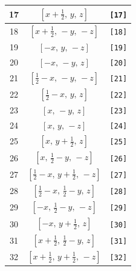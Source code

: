 \documentclass[fleqn,8pt]{jsarticle}
\begin{document}
\begin{longtable}{ccc}
17 & $\left[ x + \frac{1}{2},\, y,\, z \right]$ & {\tt [17]} \\ \hline
18 & $\left[ x + \frac{1}{2},\, - y,\, - z \right]$ & {\tt [18]} \\ \hline
19 & $\left[ - x,\, y,\, - z \right]$ & {\tt [19]} \\ \hline
20 & $\left[ - x,\, - y,\, z \right]$ & {\tt [20]} \\ \hline
21 & $\left[ \frac{1}{2} - x,\, - y,\, - z \right]$ & {\tt [21]} \\ \hline
22 & $\left[ \frac{1}{2} - x,\, y,\, z \right]$ & {\tt [22]} \\ \hline
23 & $\left[ x,\, - y,\, z \right]$ & {\tt [23]} \\ \hline
24 & $\left[ x,\, y,\, - z \right]$ & {\tt [24]} \\ \hline
25 & $\left[ x,\, y + \frac{1}{2},\, z \right]$ & {\tt [25]} \\ \hline
26 & $\left[ x,\, \frac{1}{2} - y,\, - z \right]$ & {\tt [26]} \\ \hline
27 & $\left[ \frac{1}{2} - x,\, y + \frac{1}{2},\, - z \right]$ & {\tt [27]} \\ \hline
28 & $\left[ \frac{1}{2} - x,\, \frac{1}{2} - y,\, z \right]$ & {\tt [28]} \\ \hline
29 & $\left[ - x,\, \frac{1}{2} - y,\, - z \right]$ & {\tt [29]} \\ \hline
30 & $\left[ - x,\, y + \frac{1}{2},\, z \right]$ & {\tt [30]} \\ \hline
31 & $\left[ x + \frac{1}{2},\, \frac{1}{2} - y,\, z \right]$ & {\tt [31]} \\ \hline
32 & $\left[ x + \frac{1}{2},\, y + \frac{1}{2},\, - z \right]$ & {\tt [32]} \\
\end{longtable}
\end{document}
